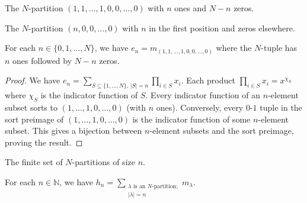 \begin{definition}
\label{def.sf.ehp-through-m.onesThenZeros}
\leanhelper
\leanok
The $N$-partition $(1, 1, \ldots, 1, 0, 0, \ldots, 0)$ with $n$ ones and $N - n$ zeros.
\end{definition}

\begin{definition}
\label{def.sf.ehp-through-m.singletonPartition}
\leanhelper
\leanok
The $N$-partition $(n, 0, 0, \ldots, 0)$ with $n$ in the first position and zeros elsewhere.
\end{definition}

\begin{theorem}
\label{prop.sf.ehp-through-m.a}
\leanhelper
\leanok
For each $n \in \{0, 1, \ldots, N\}$, we have
$e_n = m_{(1, 1, \ldots, 1, 0, 0, \ldots, 0)}$
where the $N$-tuple has $n$ ones followed by $N - n$ zeros.
\end{theorem}

\begin{proof}
\leanok
We have $e_n = \sum_{S \subseteq \{1,\ldots,N\},\, |S|=n} \prod_{i \in S} x_i$.
Each product $\prod_{i \in S} x_i = x^{\chi_S}$ where $\chi_S$ is the indicator function of $S$.
Every indicator function of an $n$-element subset sorts to
$(1, \ldots, 1, 0, \ldots, 0)$ (with $n$ ones).
Conversely, every $0$-$1$ tuple in the sort preimage of $(1, \ldots, 1, 0, \ldots, 0)$
is the indicator function of some $n$-element subset.
This gives a bijection between $n$-element subsets and the sort preimage, proving the result.
\end{proof}

\begin{definition}
\label{def.sf.NPartitionsOfSize}
\leanhelper
\leanok
The finite set of $N$-partitions of size $n$.
\end{definition}

\begin{theorem}
\label{prop.sf.ehp-through-m.b}
\leanhelper
\leanok
For each $n \in \mathbb{N}$, we have
$h_n = \sum_{\substack{\lambda \text{ is an } N\text{-partition;} \\ |\lambda| = n}} m_\lambda$.
\end{theorem}

